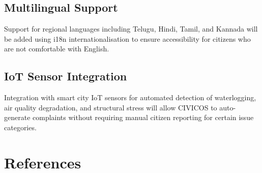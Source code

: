 \documentclass[12pt,a4paper]{report}
\begin{document}
\section{Multilingual Support}
Support for regional languages including Telugu, Hindi, Tamil, and Kannada
will be added using i18n internationalisation to ensure accessibility for
citizens who are not comfortable with English.

\section{IoT Sensor Integration}
Integration with smart city IoT sensors for automated detection of
waterlogging, air quality degradation, and structural stress will allow
CIVICOS to auto-generate complaints without requiring manual citizen
reporting for certain issue categories.

\chapter[REFERENCES]{References}
\end{document}
